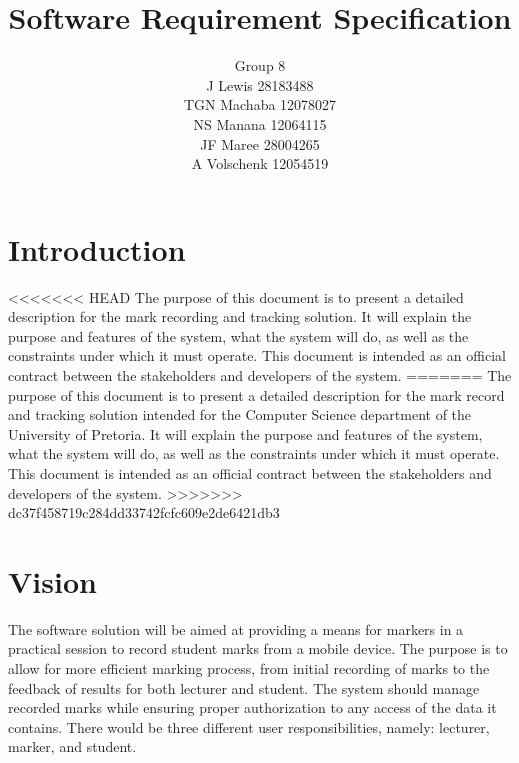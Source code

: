 \documentclass[a4paper]{article}
\begin{document}
	\title{\Huge{Software Requirement Specification}}
	\author{Group 8 \\ J Lewis	28183488\\
	TGN Machaba	12078027\\
	NS Manana	12064115\\
	JF Maree	28004265\\
	A Volschenk	12054519}
	\maketitle

	\section{Introduction}

<<<<<<< HEAD
		The purpose of this document is to present a detailed description for the mark recording and tracking solution. It will explain the purpose and features of the system, what the system will do, as well as the constraints under which it must operate. This document is intended as an official contract between the stakeholders and developers of the system.
=======
		The purpose of this document is to present a detailed description for the mark record and tracking solution intended for the Computer Science department of the University of Pretoria. It will explain the purpose and features of the system, what the system will do, as well as the constraints under which it must operate. This document is intended as an official contract between the stakeholders and developers of the system.
>>>>>>> dc37f458719c284dd33742fcfc609e2de6421db3

	\section{Vision}

		The software solution will be aimed at providing a means for markers in a practical session to record student marks from a mobile device. The purpose is to allow for more efficient marking process, from initial recording of marks to the feedback of results for both lecturer and student. The system should manage recorded marks while ensuring proper authorization to any access of the data it contains. There would be three different user responsibilities, namely: lecturer, marker, and student.
		
\end{document}
